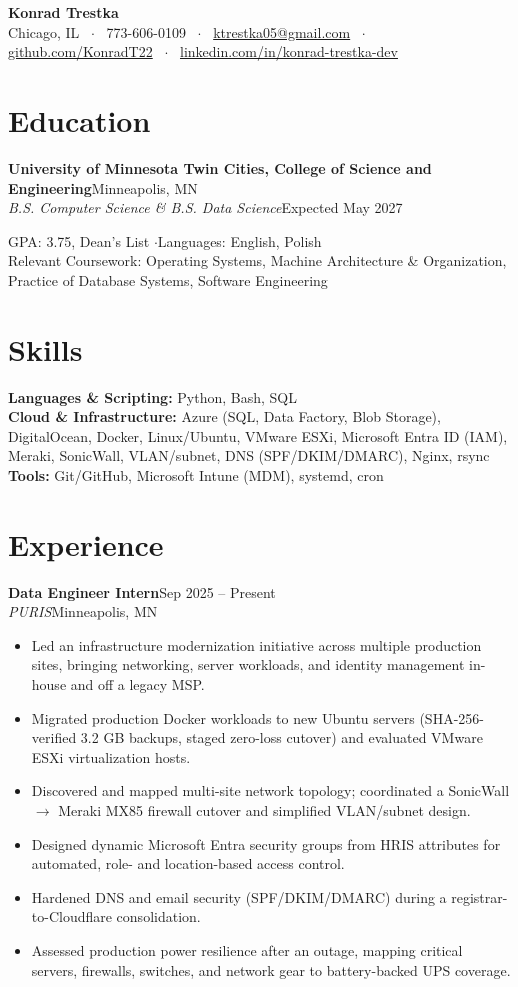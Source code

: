 \documentclass[letterpaper,10.5pt]{article}
\newcommand{\entry}[4]{\textbf{#1}\hfill{\small #2}\\\textit{\small #3}\hfill{\small #4}\par\vspace{1pt}}
\begin{document}
{\centering
{\LARGE\bfseries Konrad Trestka}\\[3pt]
{\small Chicago, IL ~$\cdot$~ 773-606-0109 ~$\cdot$~ \href{mailto:ktrestka05@gmail.com}{ktrestka05@gmail.com} ~$\cdot$~ \href{https://github.com/KonradT22}{github.com/KonradT22} ~$\cdot$~ \href{https://www.linkedin.com/in/konrad-trestka-dev}{linkedin.com/in/konrad-trestka-dev}}\par}
\vspace{2pt}

\section{Education}
\entry{University of Minnesota Twin Cities, College of Science and Engineering}{Minneapolis, MN}{B.S. Computer Science \& B.S. Data Science}{Expected May 2027}
{\small GPA: 3.75, Dean's List \quad$\cdot$\quad Languages: English, Polish \\
Relevant Coursework: Operating Systems, Machine Architecture \& Organization, Practice of Database Systems, Software Engineering}

\section{Skills}
{\small \textbf{Languages \& Scripting:} Python, Bash, SQL \\
\textbf{Cloud \& Infrastructure:} Azure (SQL, Data Factory, Blob Storage), DigitalOcean, Docker, Linux/Ubuntu, VMware ESXi, Microsoft Entra ID (IAM), Meraki, SonicWall, VLAN/subnet, DNS (SPF/DKIM/DMARC), Nginx, rsync \\
\textbf{Tools:} Git/GitHub, Microsoft Intune (MDM), systemd, cron}

\section{Experience}
\entry{Data Engineer Intern}{Sep 2025 -- Present}{PURIS}{Minneapolis, MN}
\begin{itemize}
  \item Led an infrastructure modernization initiative across multiple production sites, bringing networking, server workloads, and identity management in-house and off a legacy MSP.
  \item Migrated production Docker workloads to new Ubuntu servers (SHA-256-verified 3.2 GB backups, staged zero-loss cutover) and evaluated VMware ESXi virtualization hosts.
  \item Discovered and mapped multi-site network topology; coordinated a SonicWall $\rightarrow$ Meraki MX85 firewall cutover and simplified VLAN/subnet design.
  \item Designed dynamic Microsoft Entra security groups from HRIS attributes for automated, role- and location-based access control.
  \item Hardened DNS and email security (SPF/DKIM/DMARC) during a registrar-to-Cloudflare consolidation.
  \item Assessed production power resilience after an outage, mapping critical servers, firewalls, switches, and network gear to battery-backed UPS coverage.
\end{itemize}
\end{document}
